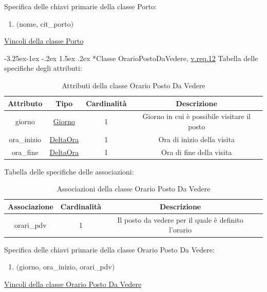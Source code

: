 \documentclass{article}
\makeatletter
\renewcommand\subsection{\@startsection{subsection}{2}{\z@}%
                                     {-3.25ex\@plus -1ex \@minus -.2ex}%
                                     {1.5ex \@plus .2ex}%
                                     {\normalfont\normalsize\bfseries}}
\makeatother
\begin{document}
Specifica delle chiavi primarie della classe Porto:
\begin{enumerate}
    \item $($nome, cit\_porto$)$
\end{enumerate}

\hyperref[sec:VincoliPorto]{Vincoli della classe Porto}

\newpage
\subsection*{Classe OrarioPostoDaVedere, \hyperref[sec:RequisitiOrarioPostoDaVedere]{v.req.12}}\label{sec:OrarioPostoDaVedere}
Tabella delle specifiche degli attributi:
\begin{table}[h!]
    \centering
    \begin{tabular}{|c|c|c|c|}
        \hline
        Attributo & Tipo & Cardinalità & Descrizione \\
        \hline
        giorno & \hyperref[sec:Giorno]{Giorno} & 1 & Giorno in cui è possibile visitare il posto \\
        ora\_inizio & \hyperref[sec:DeltaOra]{DeltaOra} & 1 & Ora di inizio della visita \\
        ora\_fine & \hyperref[sec:DeltaOra]{DeltaOra} & 1 & Ora di fine della visita \\
        \hline
    \end{tabular}
    \caption{Attributi della classe Orario Posto Da Vedere}
\end{table}

Tabella delle specifiche delle associazioni:
\begin{table}[h!]
    \centering
    \begin{tabular}{|c|c|c|c|}
        \hline
        Associazione & Cardinalità & Descrizione \\
        \hline
        orari\_pdv & 1 & Il posto da vedere per il quale è definito l'orario \\
        \hline
    \end{tabular}
    \caption{Associazioni della classe Orario Posto Da Vedere}
\end{table}

Specifica delle chiavi primarie della classe Orario Posto Da Vedere:
\begin{enumerate}
    \item $($giorno, ora\_inizio, orari\_pdv$)$
\end{enumerate}

\hyperref[sec:VincoliOrarioPostoDaVedere]{Vincoli della classe Orario Posto Da Vedere}
\end{document}
